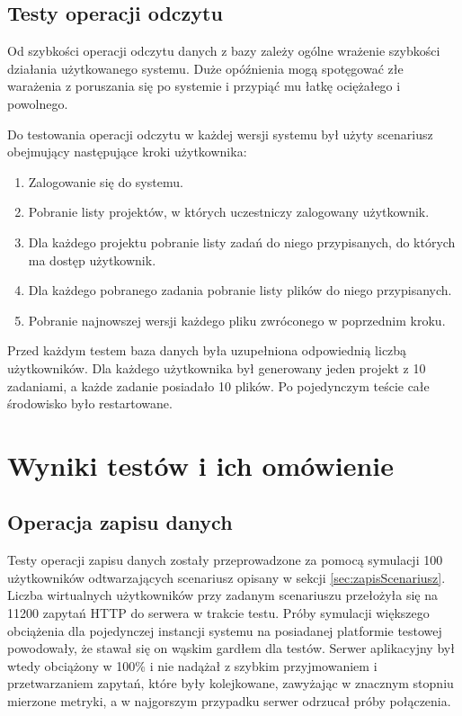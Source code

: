 \subsection{Testy operacji odczytu} \label{sec:readTestScenario}

Od szybkości operacji odczytu danych z bazy zależy ogólne wrażenie szybkości działania użytkowanego systemu.
Duże opóźnienia mogą spotęgować złe warażenia z poruszania się po systemie i przypiąć mu łatkę ociężałego i powolnego.

Do testowania operacji odczytu w każdej wersji systemu był użyty scenariusz obejmujący następujące kroki użytkownika:
\begin{enumerate}
    \item Zalogowanie się do systemu.
    \item Pobranie listy projektów, w których uczestniczy zalogowany użytkownik.
    \item Dla każdego projektu pobranie listy zadań do niego przypisanych, do których ma dostęp użytkownik.
    \item Dla każdego pobranego zadania pobranie listy plików do niego przypisanych.
    \item Pobranie najnowszej wersji każdego pliku zwróconego w poprzednim kroku.
\end{enumerate}
Przed każdym testem baza danych była uzupełniona odpowiednią liczbą użytkowników.
Dla każdego użytkownika był generowany jeden projekt z 10 zadaniami, a każde zadanie posiadało 10 plików.
Po pojedynczym teście całe środowisko było restartowane.

\section{Wyniki testów i ich omówienie}

\subsection{Operacja zapisu danych}

Testy operacji zapisu danych zostały przeprowadzone za pomocą symulacji 100 użytkowników odtwarzających scenariusz opisany w sekcji \ref{sec:zapisScenariusz}.
Liczba wirtualnych użytkowników przy zadanym scenariuszu przełożyła się na 11200 zapytań HTTP do serwera w trakcie testu.
Próby symulacji większego obciążenia dla pojedynczej instancji systemu na posiadanej platformie testowej powodowały, że stawał się on wąskim gardłem dla testów.
Serwer aplikacyjny był wtedy obciążony w 100\% i nie nadążał z szybkim przyjmowaniem i przetwarzaniem zapytań, które były kolejkowane, zawyżając w znacznym stopniu mierzone metryki, a w najgorszym przypadku serwer odrzucał próby połączenia.

